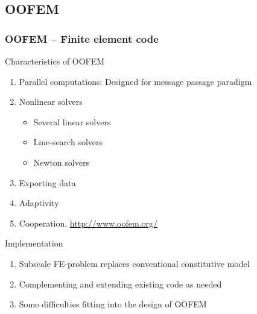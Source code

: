 \documentclass[11pt,mathserif]{beamer}
\begin{document}
\subsection{OOFEM}
\begin{frame}
 \frametitle{OOFEM -- Finite element code}
 Characteristics of OOFEM
 \begin{enumerate}
  \item<1-> Parallel computations: Designed for message passage paradigm
  \item<1-> Nonlinear solvers
  \begin{itemize}
   \item<1-> Several linear solvers
   \item<1-> Line-search solvers
   \item<1-> Newton solvers
  \end{itemize}
  \item<1-> Exporting data
  \item<1-> Adaptivity
  \item<1-> Cooperation, \url{http://www.oofem.org/}
 \end{enumerate}

  Implementation
 \begin{enumerate}
  \item<2-> Subscale FE-problem replaces conventional constitutive model
  \item<2-> Complementing and extending existing code as needed
  \item<2-> Some difficulties fitting into the design of OOFEM
 \end{enumerate}

\end{frame}
\end{document}
